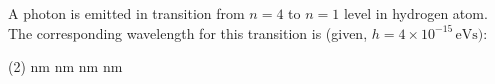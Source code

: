 \item A photon is emitted in transition from $n=4$ to $n=1$ level in hydrogen atom. The corresponding wavelength for this transition is (given, $h = 4 \times 10^{-15}\, \text{eVs})$:
    \begin{tasks}(2)
         nm
         nm
         nm
         nm
    \end{tasks}